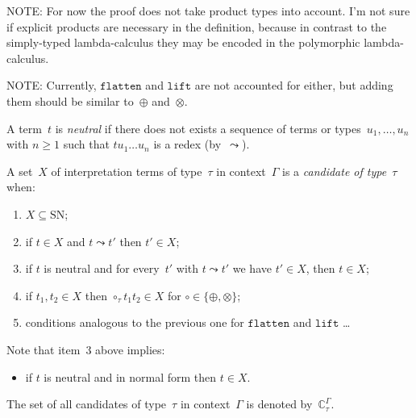 \documentclass[runningheads,a4paper]{llncs}
\newcommand{\flatten}{\mathtt{flatten}}
\newcommand{\lift}{\mathtt{lift}}
\newcommand{\SN}{\mathrm{SN}}
\newcommand{\Cb}{\mathbb{C}}
\begin{document}
NOTE: For now the proof does not take product types into account. I'm
not sure if explicit products are necessary in the definition, because
in contrast to the simply-typed lambda-calculus they may be encoded in
the polymorphic lambda-calculus.

NOTE: Currently, $\flatten$ and $\lift$ are not accounted for either,
but adding them should be similar to~$\oplus$ and~$\otimes$.

\begin{definition}\label{def_candidate}
  A term~$t$ is \emph{neutral} if there does not exists a sequence of
  terms or types~$u_1,\ldots,u_n$ with $n \ge 1$ such that
  $t u_1 \ldots u_n$ is a redex (by~$\leadsto$).

  A set~$X$ of interpretation terms of type~$\tau$ in context~$\Gamma$
  is a \emph{candidate of type~$\tau$} when:
  \begin{enumerate}
  \item $X \subseteq \SN$;
  \item if $t \in X$ and $t \leadsto t'$ then $t' \in X$;
  \item if $t$ is neutral and for every~$t'$ with $t \leadsto t'$ we
    have $t' \in X$, then $t \in X$;
  \item if $t_1,t_2 \in X$ then $\circ_\tau t_1 t_2 \in X$ for $\circ
    \in \{\oplus,\otimes\}$;
  \item conditions analogous to the previous one for $\flatten$ and
    $\lift$ \ldots
  \end{enumerate}
  Note that item~3 above implies:
  \begin{itemize}
  \item if $t$ is neutral and in normal form then $t \in X$.
  \end{itemize}
  The set of all candidates of type~$\tau$ in context~$\Gamma$ is
  denoted by~$\Cb_\tau^\Gamma$.
\end{definition}
\end{document}
